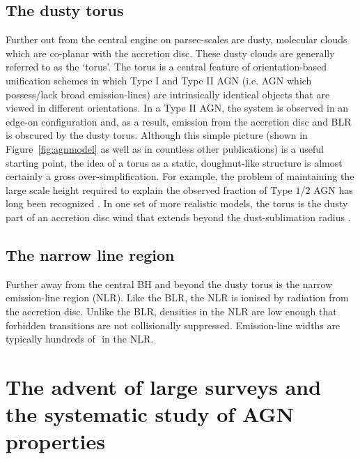 \subsection{The dusty torus}

Further out from the central engine on parsec-scales are dusty, molecular clouds which are co-planar with the accretion disc. 
These dusty clouds are generally referred to as the `torus'. 
The torus is a central feature of orientation-based unification schemes \citep[e.g.][]{antonucci93} in which Type I and Type II AGN (i.e. AGN which possess/lack broad emission-lines) are intrinsically identical objects that are viewed in different orientations. 
In a Type II AGN, the system is observed in an edge-on configuration and, as a result, emission from the accretion disc and BLR is obscured by the dusty torus.
Although this simple picture (shown in Figure~\ref{fig:agnmodel} as well as in countless other publications) is a useful starting point, the idea of a torus as a static, doughnut-like structure is almost certainly a gross over-simplification. 
For example, the problem of maintaining the large scale height required to explain the observed fraction of Type $1$/$2$ AGN has long been recognized \citep[e.g.][]{krolik88}. 
In one set of more realistic models, the torus is the dusty part of an accretion disc wind that extends beyond the dust-sublimation radius \citep[e.g.][]{konigl94,everett09,gallagher12,everett05,keating12,elitzur06}. 

\subsection{The narrow line region}

Further away from the central BH and beyond the dusty torus is the narrow emission-line region (NLR). 
Like the BLR, the NLR is ionised by radiation from the accretion disc. 
Unlike the BLR, densities in the NLR are low enough that forbidden transitions are not collisionally suppressed. 
Emission-line widths are typically hundreds of\,\kms\, in the NLR. 

\section{The advent of large surveys and the systematic study of AGN properties}

